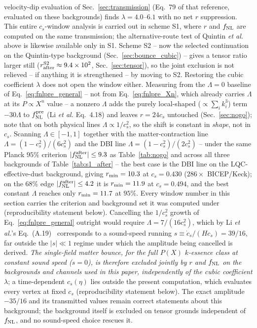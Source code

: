 \documentclass[aps,prd,twocolumn,superscriptaddress,nofootinbib,longbibliography]{revtex4-2}
\newcommand{\fnl}{f_{\rm NL}}
\begin{document}
velocity-dip evaluation of Sec.~\ref{sec:transmission} (Eq.~79 of that
reference, evaluated on these backgrounds) finds $\lambda=4.0$--$6.1$
with no net $r$ suppression. This entire $c_s$-window analysis is
carried out in scheme S1, where $r$ and $\fnl$ are computed on the
same transmission; the alternative-route test of Quintin \textit{et
al.} above is likewise available only in S1. Scheme S2 -- now the
selected continuation on the Quintin-type background
(Sec.~\ref{sec:bounce_cubic}) -- gives a tensor ratio larger still
($r_{\rm after}^{\rm S2}\approx9.4\times10^2$,
Sec.~\ref{sec:tensor}), so the joint exclusion is not relieved --
if anything it is strengthened -- by moving to S2. Restoring the cubic
coefficient $\lambda$ does not open the window either. Measuring from
the $\Lambda=0$ baseline of Eq.~\eqref{eq:fnlpre_general} -- not from
Eq.~\eqref{eq:fnlpre_Xn}, which already carries $\Lambda$ at its
$P\propto X^n$ value -- a nonzero $\Lambda$ adds the purely
local-shaped ($\propto\sum_ik_i^3$) term $-30\Lambda$ to
$\fnl^{\rm pre}$ (Li \textit{et al.} Eq.~4.18) and leaves $r=24c_s$
untouched (Sec.~\ref{sec:nogo}); note that on both physical
lines $\Lambda\propto1/c_s^2$, so the shift is constant in \emph{shape},
not in $c_s$. Scanning $\Lambda\in[-1,1]$ together with the
matter-contraction line $\Lambda=(1-c_s^2)/(6c_s^2)$ and the DBI line
$\Lambda=(1-c_s^2)/(2c_s^2)$ -- under the same Planck $95\%$ criterion
$|\fnl^{\rm after}|\le9.3$ as Table~\ref{tab:nogo} and across all three
backgrounds of Table~\ref{tab:s1_after} -- the best case is the DBI line
on the LQC-effective-dust background, giving $r_{\rm min}=10.3$ at
$c_s=0.430$ ($286\times$ BICEP/Keck); on the $68\%$ edge
$|\fnl^{\rm after}|\le4.2$ it is $r_{\rm min}=11.9$ at $c_s=0.494$, and
the best constant $\Lambda$ reaches only $r_{\rm min}=11.7$ at $95\%$.
Every window number in this section carries the criterion and background
set it was computed under (reproducibility statement below). Cancelling
the $1/c_s^2$ growth of Eq.~\eqref{eq:fnlpre_general} outright would
require $\Lambda=7/(16c_s^2)$, which by Li \textit{et al.}'s
Eq.~(A.19)~\cite{Li2016} corresponds to a sound-speed running
$s\equiv\dot c_s/(Hc_s)=39/16$, far outside the $|s|\ll1$ regime under
which the amplitude being cancelled is derived. \emph{The single-field
matter bounce, for the full $P(X)$ $k$-essence class at constant sound
speed ($s=0$), is therefore excluded jointly by $r$ and $\fnl$ on the
backgrounds and channels used in this paper, independently of the cubic
coefficient $\lambda$}; a time-dependent $c_s(\eta)$ lies outside the
present computation, which evaluates every vertex at fixed $c_s$
(reproducibility statement below).
The exact amplitude $-35/16$ and its transmitted values remain correct
statements about this background; the background itself is excluded on
tensor grounds independent of $\fnl$, and no sound-speed choice
rescues it.
\end{document}
